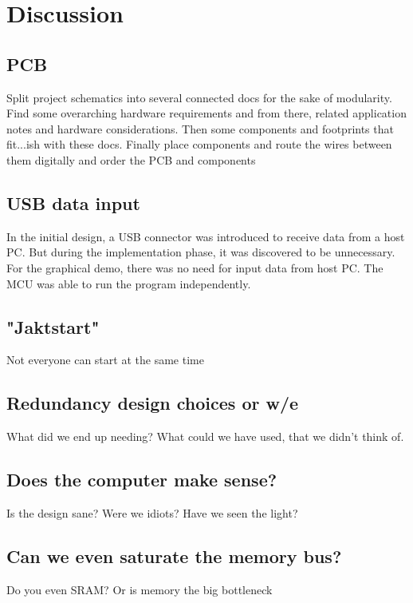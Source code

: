 \documentclass[../main/report.tex]{subfiles}
\begin{document}
\chapter{Discussion}



\section{PCB}
Split project schematics into several connected docs for the sake of modularity. Find some overarching hardware requirements and from there, related application notes and hardware considerations. Then some components and footprints that fit...ish with these docs.
Finally place components and route the wires between them digitally and order the PCB and components


\section{USB data input}
In the initial design, a USB connector was introduced to receive data from a host PC. 
But during the implementation phase, it was discovered to be unnecessary.
For the graphical demo, there was no need for input data from host PC. 
The MCU was able to run the program independently.



\section{"Jaktstart"}

Not everyone can start at the same time

\section{Redundancy design choices or w/e}
What did we end up needing?
What could we have used, that we didn't think of.

\section{Does the computer make sense?}
Is the design sane?
Were we idiots?
Have we seen the light?

\section{Can we even saturate the memory bus?}
Do you even SRAM?
Or is memory the big bottleneck
\end{document}
